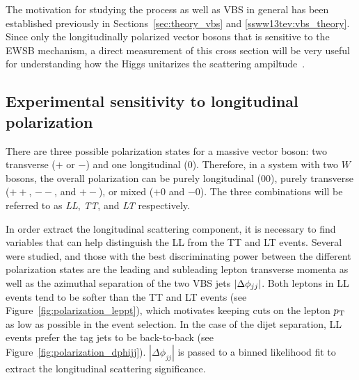 The motivation for studying the \ssww process as well as VBS in general has been established previously in Sections~\ref{sec:theory_vbs} and \ref{ssww13tev:vbs_theory}.
Since only the longitudinally polarized vector bosons that is sensitive to the EWSB mechanism, a direct measurement of this cross section will be very useful for understanding how the Higgs unitarizes the scattering ampiltude~\cite{2013.longitudinal-theory}.

\subsection{Experimental sensitivity to longitudinal polarization}\label{sec:sswwupgrade_longitudinal_sens}

There are three possible polarization states for a massive vector boson: two transverse ($+$ or $-$) and one longitudinal ($0$).
Therefore, in a system with two $W$ bosons, the overall polarization can be purely longitudinal ($00$), purely transverse ($++$, $--$, and $+-$), or mixed ($+0$ and $-0$).
The three combinations will be referred to as \emph{LL}, \emph{TT}, and \emph{LT} respectively.

In order extract the longitudinal scattering component, it is necessary to find variables that can help distinguish the LL from the TT and LT events.
Several were studied, and those with the best discriminating power between the different polarization states are the leading and subleading lepton transverse momenta as well as the azimuthal separation of the two VBS jets $|\Delta\phi_{jj}|$.
Both leptons in LL events tend to be softer than the TT and LT events (see Figure~\ref{fig:polarization_leppt}), which motivates keeping cuts on the lepton $p_{\mathrm{T}}$ as low as possible in the event selection. %
In the case of the dijet separation, LL events prefer the tag jets to be back-to-back (see Figure~\ref{fig:polarization_dphijj}).
$|\Delta\phi_{jj}|$ is passed to a binned likelihood fit to extract the longitudinal scattering significance.

